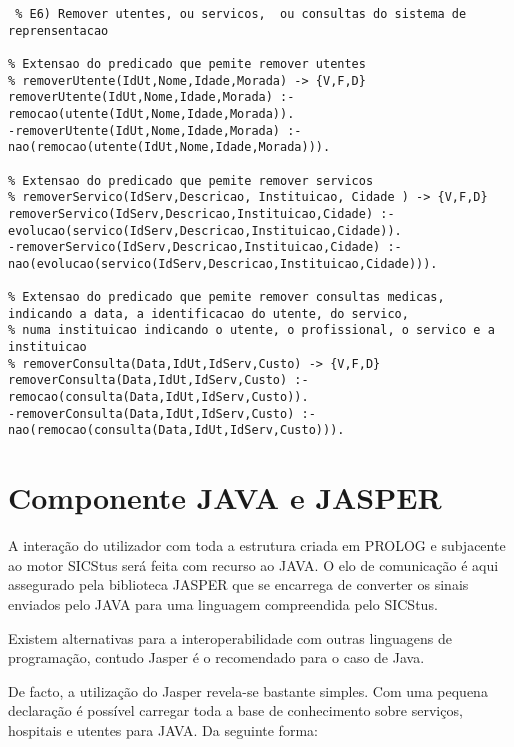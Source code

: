 \documentclass[
  oneside,
  10pt, a4paper,
  footinclude=true,
  headinclude=true,
  cleardoublepage=empty
]{scrbook}
\begin{document}
\begin{lstlisting}
 % E6) Remover utentes, ou servicos,  ou consultas do sistema de reprensentacao

% Extensao do predicado que pemite remover utentes
% removerUtente(IdUt,Nome,Idade,Morada) -> {V,F,D}
removerUtente(IdUt,Nome,Idade,Morada) :- remocao(utente(IdUt,Nome,Idade,Morada)).
-removerUtente(IdUt,Nome,Idade,Morada) :- nao(remocao(utente(IdUt,Nome,Idade,Morada))).

% Extensao do predicado que pemite remover servicos
% removerServico(IdServ,Descricao, Instituicao, Cidade ) -> {V,F,D}
removerServico(IdServ,Descricao,Instituicao,Cidade) :- evolucao(servico(IdServ,Descricao,Instituicao,Cidade)).
-removerServico(IdServ,Descricao,Instituicao,Cidade) :- nao(evolucao(servico(IdServ,Descricao,Instituicao,Cidade))).

% Extensao do predicado que pemite remover consultas medicas, indicando a data, a identificacao do utente, do servico,
% numa instituicao indicando o utente, o profissional, o servico e a instituicao
% removerConsulta(Data,IdUt,IdServ,Custo) -> {V,F,D}
removerConsulta(Data,IdUt,IdServ,Custo) :- remocao(consulta(Data,IdUt,IdServ,Custo)).
-removerConsulta(Data,IdUt,IdServ,Custo) :- nao(remocao(consulta(Data,IdUt,IdServ,Custo))).
\end{lstlisting}



% 
%
%
%
%
%

\section{Componente JAVA e JASPER}
A interação do utilizador com toda a estrutura criada em PROLOG e subjacente ao motor SICStus será feita com recurso ao JAVA. O elo de comunicação é aqui assegurado pela biblioteca JASPER que se encarrega de converter os sinais enviados pelo JAVA para uma linguagem compreendida pelo SICStus.\par
Existem alternativas para a interoperabilidade com outras linguagens de programação, contudo Jasper é o recomendado para o caso de Java.\par
De facto, a utilização do Jasper revela-se bastante simples. Com uma pequena declaração é possível carregar toda a base de conhecimento sobre serviços, hospitais e utentes para JAVA. Da seguinte forma:\par
\end{document}
